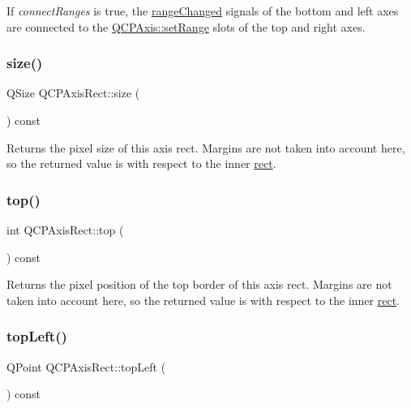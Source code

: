 If {\itshape connect\+Ranges} is true, the \mbox{\hyperlink{class_q_c_p_axis_a0894084e4c16a1736534c4095746f910}{range\+Changed}} signals of the bottom and left axes are connected to the \mbox{\hyperlink{class_q_c_p_axis_aebdfea5d44c3a0ad2b4700cd4d25b641}{Q\+C\+P\+Axis\+::set\+Range}} slots of the top and right axes. \mbox{\label{class_q_c_p_axis_rect_a7a8289346eb612f422c704f8b75cf479}} 
\subsubsection{\texorpdfstring{size()}{size()}}
{\footnotesize\ttfamily Q\+Size Q\+C\+P\+Axis\+Rect\+::size (\begin{DoxyParamCaption}{ }\end{DoxyParamCaption}) const\hspace{0.3cm}{\ttfamily [inline]}}

Returns the pixel size of this axis rect. Margins are not taken into account here, so the returned value is with respect to the inner \mbox{\hyperlink{class_q_c_p_layout_element_a208effccfe2cca4a0eaf9393e60f2dd4}{rect}}. \mbox{\label{class_q_c_p_axis_rect_a45dbad181cbb9f09d068dbb76c817c95}} 
\subsubsection{\texorpdfstring{top()}{top()}}
{\footnotesize\ttfamily int Q\+C\+P\+Axis\+Rect\+::top (\begin{DoxyParamCaption}{ }\end{DoxyParamCaption}) const\hspace{0.3cm}{\ttfamily [inline]}}

Returns the pixel position of the top border of this axis rect. Margins are not taken into account here, so the returned value is with respect to the inner \mbox{\hyperlink{class_q_c_p_layout_element_a208effccfe2cca4a0eaf9393e60f2dd4}{rect}}. \mbox{\label{class_q_c_p_axis_rect_a5a847b3ddeca3abec38d3838fefb0dbd}} 
\subsubsection{\texorpdfstring{topLeft()}{topLeft()}}
{\footnotesize\ttfamily Q\+Point Q\+C\+P\+Axis\+Rect\+::top\+Left (\begin{DoxyParamCaption}{ }\end{DoxyParamCaption}) const\hspace{0.3cm}{\ttfamily [inline]}}

